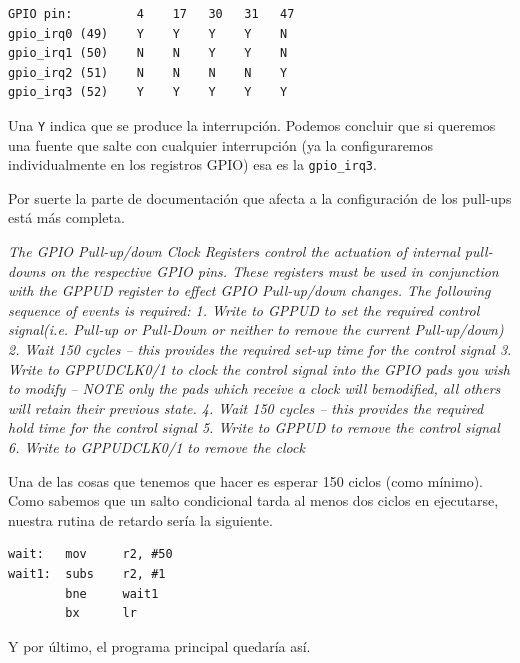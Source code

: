 \begin{lstlisting}
GPIO pin:         4    17   30   31   47
gpio_irq0 (49)    Y    Y    Y    Y    N
gpio_irq1 (50)    N    N    Y    Y    N
gpio_irq2 (51)    N    N    N    N    Y
gpio_irq3 (52)    Y    Y    Y    Y    Y
\end{lstlisting}

Una {\tt Y} indica que se produce la interrupción. Podemos concluir que si queremos una fuente
que salte con cualquier interrupción (ya la configuraremos individualmente en los registros GPIO)
esa es la {\tt gpio\_irq3}.

Por suerte la parte de documentación que afecta a la configuración de los pull-ups está más
completa.

{\it
The GPIO Pull-up/down Clock Registers control the actuation of internal pull-downs on 
the respective GPIO pins. These registers must be used in conjunction with the GPPUD 
register  to  effect  GPIO  Pull-up/down  changes.  The  following  sequence  of  events  is 
required: 
1.  Write to GPPUD to set the required control signal(i.e. Pull-up or Pull-Down or neither 
to remove the current Pull-up/down) 
2.  Wait 150 cycles – this provides the required set-up time for the control signal 
3.  Write to GPPUDCLK0/1 to clock the control signal into the GPIO pads you wish to 
modify – NOTE only the pads which receive a clock will bemodified, all others will 
retain their previous state. 
4.  Wait 150 cycles – this provides the required hold time for the control signal 
5.  Write to GPPUD to remove the control signal 
6.  Write to GPPUDCLK0/1 to remove the clock}

Una de las cosas que tenemos que hacer es esperar 150 ciclos (como mínimo). Como
sabemos que un salto condicional tarda al menos dos ciclos en ejecutarse, nuestra rutina
de retardo sería la siguiente.

\begin{lstlisting}
wait:   mov     r2, #50
wait1:  subs    r2, #1
        bne     wait1
        bx      lr
\end{lstlisting}

Y por último, el programa principal quedaría así.

